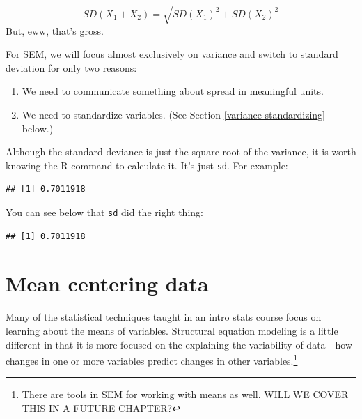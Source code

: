 \documentclass[
]{book}
\newenvironment{Shaded}{\begin{snugshade}}{\end{snugshade}}
\newcommand{\FunctionTok}[1]{\textcolor[rgb]{0.00,0.00,0.00}{#1}}
\newcommand{\NormalTok}[1]{#1}
\newcommand{\SpecialCharTok}[1]{\textcolor[rgb]{0.00,0.00,0.00}{#1}}
\providecommand{\tightlist}{%
  \setlength{\itemsep}{0pt}\setlength{\parskip}{0pt}}
\begin{document}
\[
SD\left(X_{1} + X_{2}\right) = \sqrt{
SD\left(X_{1}\right)^{2} + SD\left(X_{2}\right)^{2}
}
\]
But, eww, that's gross.

For SEM, we will focus almost exclusively on variance and switch to standard deviation for only two reasons:

\begin{enumerate}
\def\labelenumi{\arabic{enumi}.}
\tightlist
\item
  We need to communicate something about spread in meaningful units.
\item
  We need to standardize variables. (See Section \ref{variance-standardizing} below.)
\end{enumerate}

Although the standard deviance is just the square root of the variance, it is worth knowing the R command to calculate it. It's just \texttt{sd}. For example:

\begin{Shaded}
\end{Shaded}

\begin{verbatim}
## [1] 0.7011918
\end{verbatim}

You can see below that \texttt{sd} did the right thing:

\begin{Shaded}
\end{Shaded}

\begin{verbatim}
## [1] 0.7011918
\end{verbatim}

\hypertarget{variance-mean-centering}{%
\section{Mean centering data}\label{variance-mean-centering}}

Many of the statistical techniques taught in an intro stats course focus on learning about the means of variables. Structural equation modeling is a little different in that it is more focused on the explaining the variability of data---how changes in one or more variables predict changes in other variables.\footnote{There are tools in SEM for working with means as well. WILL WE COVER THIS IN A FUTURE CHAPTER?}
\end{document}

